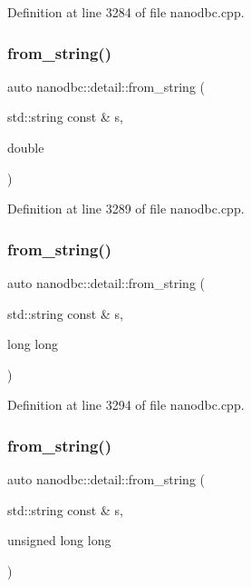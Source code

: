 Definition at line 3284 of file nanodbc.\+cpp.

\mbox{\label{namespacenanodbc_1_1detail_ae0551ce1848bfb286f2e452094bcaeb1}} 
\subsubsection{\texorpdfstring{from\_string()}{from\_string()}\hspace{0.1cm}{\footnotesize\ttfamily [2/5]}}
{\footnotesize\ttfamily auto nanodbc\+::detail\+::from\+\_\+string (\begin{DoxyParamCaption}\item[{std\+::string const \&}]{s,  }\item[{double}]{ }\end{DoxyParamCaption})}



Definition at line 3289 of file nanodbc.\+cpp.

\mbox{\label{namespacenanodbc_1_1detail_a720867751548d82577c1e401be4df253}} 
\subsubsection{\texorpdfstring{from\_string()}{from\_string()}\hspace{0.1cm}{\footnotesize\ttfamily [3/5]}}
{\footnotesize\ttfamily auto nanodbc\+::detail\+::from\+\_\+string (\begin{DoxyParamCaption}\item[{std\+::string const \&}]{s,  }\item[{long long}]{ }\end{DoxyParamCaption})}



Definition at line 3294 of file nanodbc.\+cpp.

\mbox{\label{namespacenanodbc_1_1detail_a7a37700bb1851e4d3bc4a6d852e47e55}} 
\subsubsection{\texorpdfstring{from\_string()}{from\_string()}\hspace{0.1cm}{\footnotesize\ttfamily [4/5]}}
{\footnotesize\ttfamily auto nanodbc\+::detail\+::from\+\_\+string (\begin{DoxyParamCaption}\item[{std\+::string const \&}]{s,  }\item[{unsigned long long}]{ }\end{DoxyParamCaption})}



